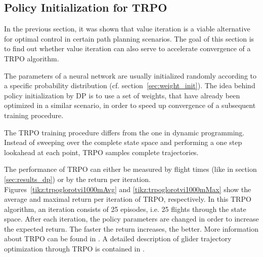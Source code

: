 %	
%	

\newpage
\subsection{Policy Initialization for TRPO}
\label{sec:dp_init_trpo}
In the previous section, it was shown that value iteration is a viable alternative for optimal control in certain path planning scenarios. The goal of this section is to find out whether value iteration can also serve to accelerate convergence of a TRPO algorithm.

The parameters of a neural network are usually initialized randomly according to a specific probability distribution (cf. section~\ref{sec:weight_init}). The idea behind policy initialization by DP is to use a set of weights, that have already been optimized in a similar scenario, in order to speed up convergence of a subsequent training procedure.

The TRPO training procedure differs from the one in dynamic programming. Instead of sweeping over the complete state space and performing a one step lookahead at each point, TRPO samples complete trajectories.

The performance of TRPO can either be measured by flight times (like in section \ref{sec:results_dp}) or by the return per iteration. Figures~\ref{tikz:trpoglorotvi1000mAvg} and \ref{tikz:trpoglorotvi1000mMax} show the average and maximal return per iteration of TRPO, respectively. In this TRPO algorithm, an iteration consists of 25 episodes, i.e. 25 flights through the state space. After each iteration, the policy parameters are changed in order to increase the expected return. The faster the return increases, the better. More information about TRPO can be found in \cite{DBLP:journals/corr/SchulmanLMJA15}. A detailed description of glider trajectory optimization through TRPO is contained in \cite{Zuern2017}.

